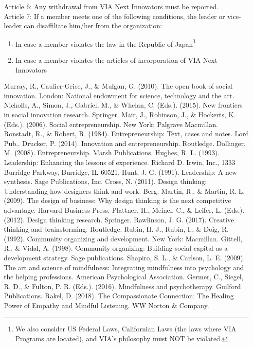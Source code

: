 \documentclass[dvipdfmx]{article}
\begin{document}
Article 6: Any withdrawal from VIA Next Innovators must be reported.\\
Article 7: If a member meets one of the following conditions, the leader or vice-leader can disaffiliate him/her from the organization:
\begin{enumerate}
\item In case a member violates the law in the Republic of Japan\footnote{We also consider US Federal Laws, Californian Laws (the laws where VIA Programs are located), and VIA's philosophy must NOT be violated.}
\item In case a member violates the articles of incorporation of VIA Next Innovators
\end{enumerate}
\begin{thebibliography}{99}
Murray, R., Caulier-Grice, J., \& Mulgan, G. (2010). The open book of social innovation. London: National endowment for science, technology and the art.
Nicholls, A., Simon, J., Gabriel, M., \& Whelan, C. (Eds.). (2015). New frontiers in social innovation research. Springer.
Mair, J., Robinson, J., \& Hockerts, K. (Eds.). (2006). Social entrepreneurship. New York: Palgrave Macmillan.
Ronstadt, R., \& Robert, R. (1984). Entrepreneurship: Text, cases and notes. Lord Pub..
Drucker, P. (2014). Innovation and entrepreneurship. Routledge.
Dollinger, M. (2008). Entrepreneurship. Marsh Publications.
Hughes, R. L. (1993). Leadership: Enhancing the lessons of experience. Richard D. Irwin, Inc., 1333 Burridge Parkway, Burridge, IL 60521.
Hunt, J. G. (1991). Leadership: A new synthesis. Sage Publications, Inc.
Cross, N. (2011). Design thinking: Understanding how designers think and work. Berg.
Martin, R., \& Martin, R. L. (2009). The design of business: Why design thinking is the next competitive advantage. Harvard Business Press.
Plattner, H., Meinel, C., \& Leifer, L. (Eds.). (2012). Design thinking research. Springer.
Rawlinson, J. G. (2017). Creative thinking and brainstorming. Routledge.
Rubin, H. J., Rubin, I., \& Doig, R. (1992). Community organizing and development. New York: Macmillan.
Gittell, R., \& Vidal, A. (1998). Community organizing: Building social capital as a development strategy. Sage publications.
Shapiro, S. L., \& Carlson, L. E. (2009). The art and science of mindfulness: Integrating mindfulness into psychology and the helping professions. American Psychological Association.
Germer, C., Siegel, R. D., \& Fulton, P. R. (Eds.). (2016). Mindfulness and psychotherapy. Guilford Publications.
Rakel, D. (2018). The Compassionate Connection: The Healing Power of Empathy and Mindful Listening. WW Norton \& Company.

\end{thebibliography}
\end{document}
